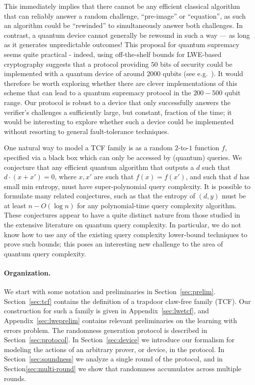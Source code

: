 \documentclass[11pt]{article}
\theoremstyle{remark}
\theoremstyle{definition}
\begin{document}
%
This immediately implies that there cannot be any efficient classical algorithm that can reliably answer a random 
challenge, ``pre-image'' or ``equation'', as such an algorithm could be ``rewinded'' to simultaneously answer both challenges. In contrast, a quantum device cannot generally be rewound in such a way --- as long as it generates unpredictable outcomes! This proposal for quantum supremacy seems quite practical - indeed, using off-the-shelf bounds for  LWE-based cryptography suggests that a protocol providing $50$ bits of security could be implemented with a quantum device of around $2000$ qubits (see e.g.~\cite{lindner2011better}). It would therefore be worth exploring whether there are clever implementations of this scheme that can lead to a quantum supremacy protocol in the $200-500$ qubit range. Our protocol is robust to a device that only successfully answers the verifier's challenges a sufficiently large, but constant, fraction of the time; it would be interesting to explore whether such a device could be implemented without resorting to general fault-tolerance techniques.

\medskip

One natural way to model a TCF family is as a random $2$-to-$1$ function $f$, specified via a black box which can only be accessed by (quantum) queries.
We conjecture that any efficient quantum 
algorithm that outputs a $d$ such that $ d\cdot(x + x') = 0$, where $x,x'$ are such that $f(x) = f(x')$, and such that $d$ has small min entropy, must have super-polynomial query complexity. 
It is possible to formulate many related conjectures, such as that the entropy of $(d, y)$ must be at least $n - O(\log n)$ for any 
polynomial-time query complexity algorithm. These conjectures appear to have a quite distinct nature from those studied in the 
extensive literature on quantum query complexity. In particular, we do not know how to use 
any of the existing query complexity lower-bound techniques to prove such bounds;  this poses an interesting new challenge to 
the area of quantum query complexity. 

\paragraph{Organization.} We start with some notation and preliminaries in Section~\ref{sec:prelim}. Section~\ref{sec:tcf} contains the definition of a trapdoor claw-free family (TCF). Our construction for such a family is given in Appendix~\ref{sec:lwetcf}, and Appendix~\ref{sec:lweprelim} contains relevant preliminaries on the learning with errors problem. The randomness generation protocol is described in Section~\ref{sec:protocol}. In Section~\ref{sec:device} we introduce our formalism for modeling the actions of an arbitrary prover, or device, in the protocol. In Section~\ref{sec:soundness} we analyze a single round of the protocol, and in Section\ref{sec:multi-round} we show that randomness accumulates across multiple rounds. 
\end{document}
